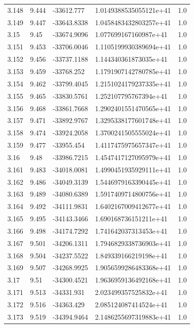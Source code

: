\begin{tabular}{lllll}
3.148 & 9.444 & -33612.777 & 1.0149388535055121e+41 & 1.0 \\
3.149 & 9.447 & -33643.8338 & 1.0458483432803257e+41 & 1.0 \\
3.15 & 9.45 & -33674.9096 & 1.077699167160987e+41 & 1.0 \\
3.151 & 9.453 & -33706.0046 & 1.1105199930389694e+41 & 1.0 \\
3.152 & 9.456 & -33737.1188 & 1.144340361873035e+41 & 1.0 \\
3.153 & 9.459 & -33768.252 & 1.1791907142780785e+41 & 1.0 \\
3.154 & 9.462 & -33799.4045 & 1.2151024179237335e+41 & 1.0 \\
3.155 & 9.465 & -33830.5761 & 1.252107795767394e+41 & 1.0 \\
3.156 & 9.468 & -33861.7668 & 1.2902401551470565e+41 & 1.0 \\
3.157 & 9.471 & -33892.9767 & 1.3295338177601748e+41 & 1.0 \\
3.158 & 9.474 & -33924.2058 & 1.3700241505555024e+41 & 1.0 \\
3.159 & 9.477 & -33955.454 & 1.4117475975657347e+41 & 1.0 \\
3.16 & 9.48 & -33986.7215 & 1.4547417127095979e+41 & 1.0 \\
3.161 & 9.483 & -34018.0081 & 1.4990451935929111e+41 & 1.0 \\
3.162 & 9.486 & -34049.3139 & 1.5446979163390445e+41 & 1.0 \\
3.163 & 9.489 & -34080.6389 & 1.5917409714800756e+41 & 1.0 \\
3.164 & 9.492 & -34111.9831 & 1.6402167009412677e+41 & 1.0 \\
3.165 & 9.495 & -34143.3466 & 1.690168736151211e+41 & 1.0 \\
3.166 & 9.498 & -34174.7292 & 1.741642037313453e+41 & 1.0 \\
3.167 & 9.501 & -34206.1311 & 1.7946829338736903e+41 & 1.0 \\
3.168 & 9.504 & -34237.5522 & 1.849339166219198e+41 & 1.0 \\
3.169 & 9.507 & -34268.9925 & 1.9056599286483368e+41 & 1.0 \\
3.17 & 9.51 & -34300.4521 & 1.9636959136492168e+41 & 1.0 \\
3.171 & 9.513 & -34331.931 & 2.023499357525832e+41 & 1.0 \\
3.172 & 9.516 & -34363.429 & 2.085124087414524e+41 & 1.0 \\
3.173 & 9.519 & -34394.9464 & 2.1486255697319883e+41 & 1.0 \\

\end{tabular}
